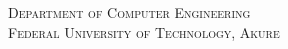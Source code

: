 \begin{titlepage}
\begin{center}
	\textsc{Department of Computer Engineering\\
		Federal University of Technology, Akure}
\end{center}



\end{titlepage}
